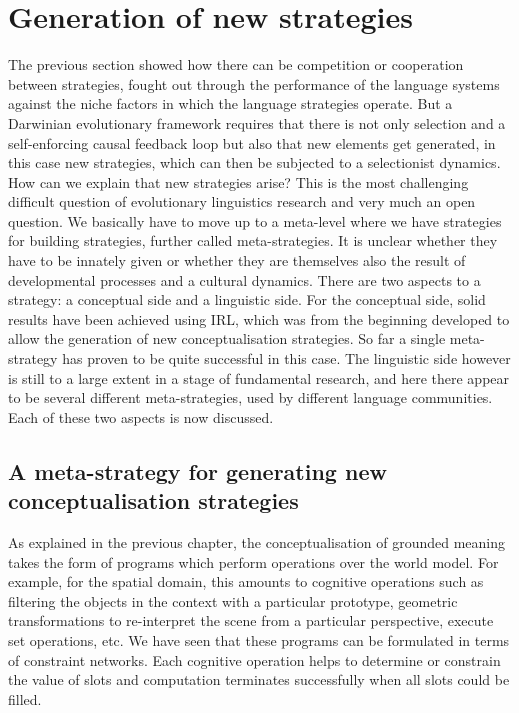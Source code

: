 \section{Generation of new strategies}

The previous section showed how there can be competition or cooperation between strategies, fought out through the 
performance of the language systems against the niche factors in which 
the language strategies operate. But a Darwinian evolutionary framework requires that there is not only 
selection and a self-enforcing causal feedback loop 
but also that new elements get generated, in this case new strategies, which can then be subjected to 
a selectionist dynamics. How can we explain that new 
strategies arise? This is the most challenging difficult question of evolutionary linguistics research and very much an 
open question. We basically have to move up to a meta-level where we have strategies for building 
strategies, further called meta-strategies.  It is unclear whether they have to be innately given or 
whether they are themselves also the result of developmental processes and a cultural dynamics. 
There are two aspects to a strategy: a conceptual side and a linguistic side. For the conceptual 
side, solid results have been achieved using IRL, which was from the beginning developed to allow the generation of 
new conceptualisation strategies. So far a single meta-strategy has proven to be quite successful in this case. 
The linguistic side however is still to a large extent in a stage of fundamental research, and here there appear to 
be several different meta-strategies, used by different language communities. Each of these two aspects is now 
discussed.\\

\subsection{A meta-strategy for generating new conceptualisation strategies}

As explained in the previous chapter, the conceptualisation of grounded meaning takes the form of programs which perform 
operations over the world model. For example, for the spatial domain, this amounts to
cognitive operations such as filtering the objects in the context with a particular prototype, geometric 
transformations to re-interpret the scene from a particular perspective, execute set operations, etc. We have seen that these 
programs can be formulated in terms of constraint networks. Each cognitive operation helps to determine or constrain
the value of slots and computation terminates successfully when all slots could be filled. 


